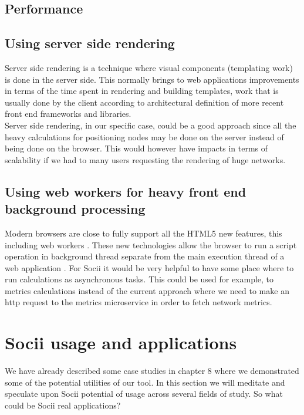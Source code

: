 \subsection{Performance}

\subsection*{Using server side rendering}
Server side rendering is a technique where visual components (templating work) is done in the server side. This normally brings to web applications improvements in terms of the time spent in rendering and building templates, work that is usually done by the client according to architectural definition of more recent front end frameworks and libraries.\\
\indent Server side rendering, in our specific case, could be a good approach since all the heavy calculations for positioning nodes
may be done on the server instead of being done on the browser. This would however have impacts in terms of scalability if we had to many users requesting
the rendering of huge networks.

\subsection*{Using web workers for heavy front end background processing}
Modern browsers are close to fully support all the HTML5 new features, this including web workers \citep{webworkers}. These new technologies allow
the browser to run a script operation in background thread separate from the main execution thread of a web application \citep{mdnwebworkers}. For Socii it would be very helpful to have some place where to run calculations as asynchronous tasks. This could be used for example, to metrics calculations instead of the current approach where we need to make an http request to the metrics microservice in order to fetch network metrics.

\section{Socii usage and applications}
We have already described some case studies in chapter 8 where we demonstrated some of the potential utilities of our tool. In this section we will meditate and speculate upon Socii potential of usage across several fields of study. So what could be Socii real applications?

